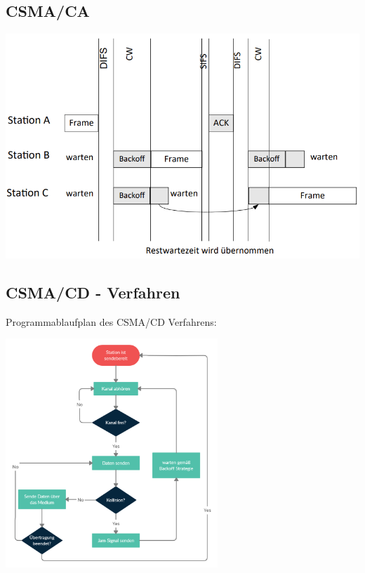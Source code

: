 \documentclass[12pt,a4paper]{article}
\begin{document}
		\subsection{CSMA/CA}
			\begin{center}
				\includegraphics[width=\textwidth]{Bilder/csmaca.PNG}
			\end{center}

		\subsection{CSMA/CD - Verfahren}
			Programmablaufplan des CSMA/CD Verfahrens:
			\begin{center}
				\includegraphics[width=0.6\textwidth]{Bilder/CSMACD.png}
			\end{center}
		
\end{document}
